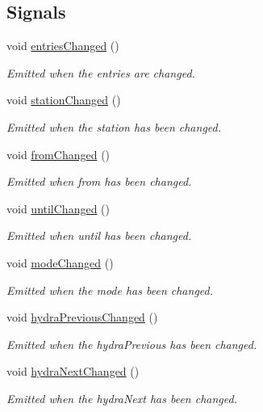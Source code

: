 \subsection*{Signals}
\begin{DoxyCompactItemize}
\item 
void \mbox{\hyperlink{classQRail_1_1LiveboardEngine_1_1Board_a6a08cd7c9e73e7b9892858d26066c1d8}{entries\+Changed}} ()
\begin{DoxyCompactList}\small\item\em Emitted when the entries are changed. \end{DoxyCompactList}\item 
void \mbox{\hyperlink{classQRail_1_1LiveboardEngine_1_1Board_ae142ed88bebe608a99f61d09ceacf4b5}{station\+Changed}} ()
\begin{DoxyCompactList}\small\item\em Emitted when the station has been changed. \end{DoxyCompactList}\item 
void \mbox{\hyperlink{classQRail_1_1LiveboardEngine_1_1Board_ae036b6efe4d807d6679a7f6b92f18b28}{from\+Changed}} ()
\begin{DoxyCompactList}\small\item\em Emitted when from has been changed. \end{DoxyCompactList}\item 
void \mbox{\hyperlink{classQRail_1_1LiveboardEngine_1_1Board_aa2d6f92cc84b2f68d7870f514e6267ef}{until\+Changed}} ()
\begin{DoxyCompactList}\small\item\em Emitted when until has been changed. \end{DoxyCompactList}\item 
void \mbox{\hyperlink{classQRail_1_1LiveboardEngine_1_1Board_a10e65fb6aa6c56428ba4d700e3b6a67d}{mode\+Changed}} ()
\begin{DoxyCompactList}\small\item\em Emitted when the mode has been changed. \end{DoxyCompactList}\item 
void \mbox{\hyperlink{classQRail_1_1LiveboardEngine_1_1Board_afd6981cdcbd9e49393fbb8e4a4b22157}{hydra\+Previous\+Changed}} ()
\begin{DoxyCompactList}\small\item\em Emitted when the hydra\+Previous has been changed. \end{DoxyCompactList}\item 
void \mbox{\hyperlink{classQRail_1_1LiveboardEngine_1_1Board_a775b5fd9886b209fc9ccdcdbbd206261}{hydra\+Next\+Changed}} ()
\begin{DoxyCompactList}\small\item\em Emitted when the hydra\+Next has been changed. \end{DoxyCompactList}\end{DoxyCompactItemize}
